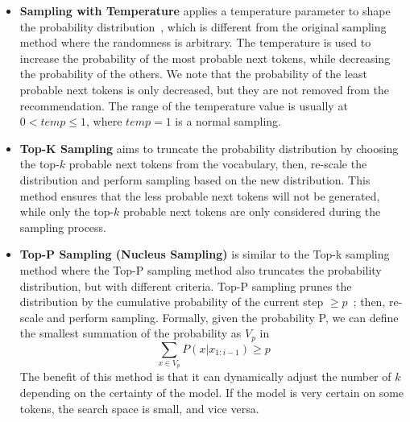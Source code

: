 \begin{itemize}
    \item \textbf{Sampling with Temperature} applies a temperature parameter to shape the probability distribution~\cite{ackley1985learning}, which is different from the original sampling method where the randomness is arbitrary.
    The temperature is used to increase the probability of the most probable next tokens, while decreasing the probability of the others.
    We note that the probability of the least probable next tokens is only decreased, but they are not removed from the recommendation.
    The range of the temperature value is usually at $0 < temp \le 1$, where $temp = 1$ is a normal sampling.

    \item \textbf{Top-K Sampling} aims to truncate the probability distribution by choosing the top-$k$ probable next tokens from the vocabulary, then, re-scale the distribution and perform sampling based on the new distribution.
    This method ensures that the less probable next tokens will not be generated, while only the top-$k$ probable next tokens are only considered during the sampling process.
    
    \item \textbf{Top-P Sampling (Nucleus Sampling)} is similar to the Top-k sampling method where the Top-P sampling method also truncates the probability distribution, but with different criteria. 
    Top-P sampling prunes the distribution by the cumulative probability of the current step $\ge p$~\cite{holtzman2019curious}; then, re-scale and perform sampling.
    Formally, given the probability P, we can define the smallest summation of the probability as $V_p$ in
    \begin{equation}
        \label{eq:top-p}
        \sum_{x\in V_p} P(x|x_{1:i-1}) \ge p
    \end{equation}
    The benefit of this method is that it can dynamically adjust the number of $k$ depending on the certainty of the model.
    If the model is very certain on some tokens, the search space is small, and vice versa.
\end{itemize}